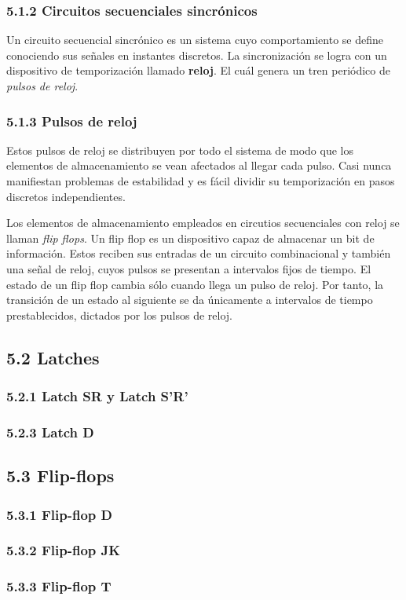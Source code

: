 \subsubsection*{5.1.2 Circuitos secuenciales sincr\'{o}nicos}
Un circuito secuencial sincr\'{o}nico es un sistema cuyo comportamiento se define conociendo sus se\~{n}ales
en instantes discretos. La sincronizaci\'{o}n se logra con un dispositivo de temporizaci\'{o}n llamado \textbf{reloj}.
El cu\'{a}l genera un tren peri\'{o}dico de \textit{pulsos de reloj}.

\subsubsection*{5.1.3 Pulsos de reloj}

Estos pulsos de reloj se distribuyen por todo el sistema de modo que los elementos de almacenamiento se vean afectados
al llegar cada pulso. Casi nunca manifiestan problemas de estabilidad y es f\'{a}cil dividir su temporizaci\'{o}n
en pasos discretos independientes.

Los elementos de almacenamiento empleados en circutios secuenciales con reloj se llaman \textit{flip flops}.
Un flip flop es un dispositivo capaz de almacenar un bit de informaci\'{o}n. Estos reciben sus entradas de un 
circuito combinacional y tambi\'{e}n una se\~{n}al de reloj, cuyos pulsos se presentan a intervalos fijos de tiempo.
El estado de un flip flop cambia s\'{o}lo cuando llega un pulso de reloj. Por tanto, la transici\'{o}n de un estado
al siguiente se da \'{u}nicamente a intervalos de tiempo prestablecidos, dictados por los pulsos de reloj.

\subsection*{5.2 Latches}
\subsubsection*{5.2.1 Latch SR y Latch S'R'}
\subsubsection*{5.2.3 Latch D}

\subsection*{5.3 Flip-flops}
\subsubsection*{5.3.1 Flip-flop D}
\subsubsection*{5.3.2 Flip-flop JK}
\subsubsection*{5.3.3 Flip-flop T}